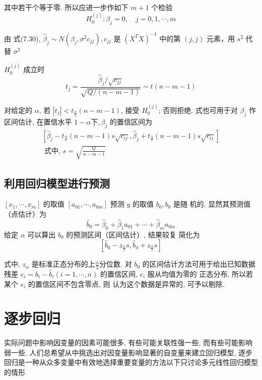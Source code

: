 其中若干个等于零. 所以应进一步作如下 \( {m}+{1} \) 个检验
$$H_{0}^{(j)}: \beta_{j}=0, \quad j=0,1, \cdots, m $$

由 式(7.30), $\hat{\beta}_{j} \sim N\left(\beta_{j}, \sigma^{2} c_{j j}\right), c_{j j}$  是 $\left(X^{T} X\right)^{-1}$  中的第 $ (j, j) $ 元素，用 $ s^{2} $ 代替 $ \sigma^{2} $


\( {H}_{0}^{(j)} \) 成立时
$$
t_{j}=\frac{\hat{\beta}_{j} / \sqrt{c_{j j}}}{\sqrt{Q /(n-m-1)}} \sim t(n-m-1)
$$

对给定的 $ \alpha $, 若 $ \left|t_{j}\right|<t_{\frac{\alpha}{2}}(n-m-1) $, 接受 $ H_{0}^{(j)} $; 否则拒绝.  式也可用于对 \( \beta_{j} \) 作区间估计, 在置信水平 \( 1-\alpha 下, \beta_{j} \) 的置信区间为
$$
\begin{array}{l}
{\left[\hat{\beta}_{j}-t_{\frac{\alpha}{2}}(n-m-1) s \sqrt{c_{i j}}, \hat{\beta}_{j}+t_{\frac{\alpha}{2}}(n-m-1) s \sqrt{c_{i j}}\right]} \\
\text { 式中, } s=\sqrt{\frac{Q}{n-m-1}} 
\end{array}
$$

\subsection{利用回归模型进行预测}

\( \left[x_{1}, \cdots, x_{m}\right] \) 的取值 \( \left[a_{01}, \cdots, a_{0 m}\right] \) 预测 \( y \) 的取值 \( b_{0}, b_{0} \) 是随 机的, 显然其预测值（点估计）为
$$
\hat{b}_{0}=\hat{\beta}_{0}+\hat{\beta}_{1} a_{01}+\cdots+\hat{\beta}_{m} a_{0 m} 
$$
给定 \( \alpha \) 可以算出 \( {b}_{{0}} \) 的预测区间（区间估计）, 结果较复
简化为
$$
\left[\hat{b}_{0}-z_{\frac{\alpha}{2}} s, \hat{b}_{0}+z_{\frac{\alpha}{2}} s\right]
$$

式中, \( {z}_{\alpha} \) 是标准正态分布的上$\frac{\alpha}{2} $分位数. 
对 \( {b}_{0} \) 的区间估计方法可用于给出已知数据残差 \( {e}_{i}={b}_{{i}}-\hat{{b}}_{{i}}({i}={1}, \cdots, {n}) \) 的置信区间, \( {e}_{i} \) 服从均值为零的
正态分布, 所以若某个 \( e_{i} \) 的置信区间不包含零点, 则 认为这个数据是异常的, 可予以剔除. 

\section{逐步回归}

实际问题中影响因变量的因素可能很多, 有些可能关联性强一些, 而有些可能影响弱一些. 人们总希望从中挑选出对因变量影响显著的自变量来建立回归模型, 逐步回归是一种从众多变量中有效地选择重要变量的方法以下只讨论多元线性回归模型的情形

